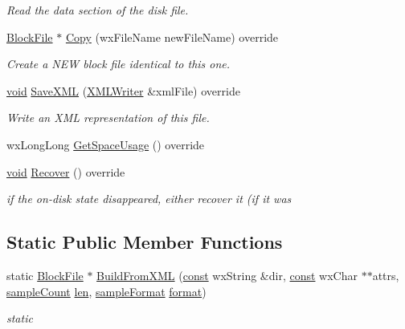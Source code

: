 \begin{DoxyCompactItemize}
\begin{DoxyCompactList}\small\item\em Read the data section of the disk file. \end{DoxyCompactList}\item 
\hyperlink{class_block_file}{Block\+File} $\ast$ \hyperlink{class_legacy_block_file_ad756e67912292d3f699d9f4666153df8}{Copy} (wx\+File\+Name new\+File\+Name) override
\begin{DoxyCompactList}\small\item\em Create a N\+EW block file identical to this one. \end{DoxyCompactList}\item 
\hyperlink{sound_8c_ae35f5844602719cf66324f4de2a658b3}{void} \hyperlink{class_legacy_block_file_ae420fbdcabbd953d344de725a9894ae9}{Save\+X\+ML} (\hyperlink{class_x_m_l_writer}{X\+M\+L\+Writer} \&xml\+File) override
\begin{DoxyCompactList}\small\item\em Write an X\+ML representation of this file. \end{DoxyCompactList}\item 
wx\+Long\+Long \hyperlink{class_legacy_block_file_ac64775a57b6a5d7c870ba5cbe8bf357b}{Get\+Space\+Usage} () override
\item 
\hyperlink{sound_8c_ae35f5844602719cf66324f4de2a658b3}{void} \hyperlink{class_legacy_block_file_acb70002f6792fcc5cd15181c8513db2b}{Recover} () override
\begin{DoxyCompactList}\small\item\em if the on-\/disk state disappeared, either recover it (if it was \end{DoxyCompactList}\end{DoxyCompactItemize}
\subsection*{Static Public Member Functions}
\begin{DoxyCompactItemize}
\item 
static \hyperlink{class_block_file}{Block\+File} $\ast$ \hyperlink{class_legacy_block_file_a8fb35bc6cf68a21341d61e3c9e6bfcac}{Build\+From\+X\+ML} (\hyperlink{getopt1_8c_a2c212835823e3c54a8ab6d95c652660e}{const} wx\+String \&dir, \hyperlink{getopt1_8c_a2c212835823e3c54a8ab6d95c652660e}{const} wx\+Char $\ast$$\ast$attrs, \hyperlink{include_2audacity_2_types_8h_afa427e1f521ea5ec12d054e8bd4d0f71}{sample\+Count} \hyperlink{lib_2expat_8h_af86d325fecfc8f47b61fbf5a5146f582}{len}, \hyperlink{include_2audacity_2_types_8h_a9938d2e2f6adef23e745cd80ef379792}{sample\+Format} \hyperlink{_export_p_c_m_8cpp_a317afff57d87a89158c2b038d37b2b08}{format})
\begin{DoxyCompactList}\small\item\em static \end{DoxyCompactList}\end{DoxyCompactItemize}
